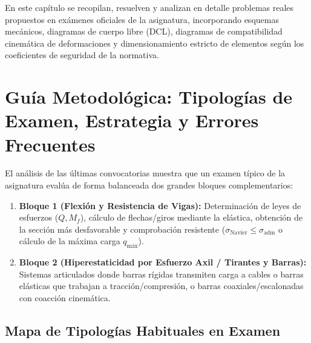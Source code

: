 
En este capítulo se recopilan, resuelven y analizan en detalle problemas reales propuestos en exámenes oficiales de la asignatura, incorporando esquemas mecánicos, diagramas de cuerpo libre (DCL), diagramas de compatibilidad cinemática de deformaciones y dimensionamiento estricto de elementos según los coeficientes de seguridad de la normativa.

\section{Guía Metodológica: Tipologías de Examen, Estrategia y Errores Frecuentes}

El análisis de las últimas convocatorias muestra que un examen típico de la asignatura evalúa de forma balanceada dos grandes bloques complementarios:
\begin{enumerate}[label=\textbf{\Roman*.}]
    \item \textbf{Bloque 1 (Flexión y Resistencia de Vigas):} Determinación de leyes de esfuerzos ($Q, M_f$), cálculo de flechas/giros mediante la elástica, obtención de la sección más desfavorable y comprobación resistente ($\sigma_{\text{Navier}} \le \sigma_{\text{adm}}$ o cálculo de la máxima carga $q_{\text{máx}}$).
    \item \textbf{Bloque 2 (Hiperestaticidad por Esfuerzo Axil / Tirantes y Barras):} Sistemas articulados donde barras rígidas transmiten carga a cables o barras elásticas que trabajan a tracción/compresión, o barras coaxiales/escalonadas con coacción cinemática.
\end{enumerate}

\subsection{Mapa de Tipologías Habituales en Examen}

